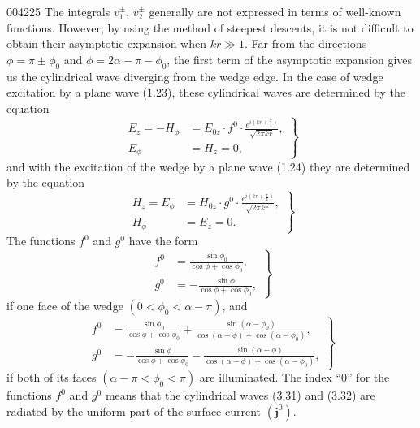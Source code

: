\begin{scanpage}{0042}{25}
The integrals $v_1^{\pm}$, $v_2^{\pm}$ generally are not expressed in terms of well-known functions. However, by using the method of steepest descents, it is not difficult to obtain their asymptotic expansion when $kr\gg1$. Far from the directions $\phi=\pi\pm\phi_0$ and $\phi=2\alpha-\pi-\phi_0$, the first term of the asymptotic expansion gives us the cylindrical wave diverging from the wedge edge. In the case of wedge excitation by a plane wave (1.23), these cylindrical waves are determined by the equation
\[\left.\begin{aligned}E_z=-H_\phi&=E_{0z}\cdot f^0\cdot\frac{e^{i(kr+\frac\pi4)}}{\sqrt{2\pi kr}},\\E_\phi&=H_z=0,\end{aligned}\right\}\tag{3.31}\]
and with the excitation of the wedge by a plane wave (1.24) they are determined by the equation
\[\left.\begin{aligned}H_z=E_\phi&=H_{0z}\cdot g^0\cdot\frac{e^{i(kr+\frac\pi4)}}{\sqrt{2\pi kr}},\\H_\phi&=E_z=0.\end{aligned}\right\}\tag{3.32}\]
The functions $f^0$ and $g^0$ have the form
\[\left.\begin{aligned}f^0&=\frac{\sin\phi_0}{\cos\phi+\cos\phi_0},\\g^0&=-\frac{\sin\phi}{\cos\phi+\cos\phi_0},\end{aligned}\right\}\tag{3.33}\]
if one face of the wedge $(0<\phi_0<\alpha-\pi)$, and
\[\left.\begin{aligned}f^0&=\frac{\sin\phi_0}{\cos\phi+\cos\phi_0}+\frac{\sin(\alpha-\phi_0)}{\cos(\alpha-\phi)+\cos(\alpha-\phi_0)},\\g^0&=-\frac{\sin\phi}{\cos\phi+\cos\phi_0}-\frac{\sin(\alpha-\phi)}{\cos(\alpha-\phi)+\cos(\alpha-\phi_0)},\end{aligned}\right\}\tag{3.34}\]
if both of its faces $(\alpha-\pi<\phi_0<\pi)$ are illuminated. The index ``0'' for the functions $f^0$ and $g^0$ means that the cylindrical waves (3.31) and (3.32) are radiated by the uniform part of the surface current $(\mathbf j^0)$.
\end{scanpage}
